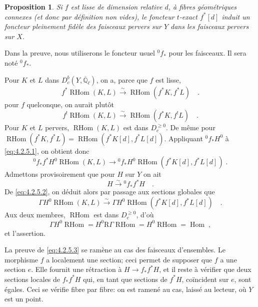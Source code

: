 \documentclass[12pt,a4paper]{article}
\theoremstyle{plain}
\newtheorem{proposition}[theorem]{Proposition}
\theoremstyle{definition}
\DeclareMathOperator{\Hom}{Hom}
\DeclareMathOperator{\RHom}{RHom}
\newcommand{\isom}{\xrightarrow{\sim}}
\providecommand{\Hom}{\operatorname{Hom}}
\providecommand{\R}{\mathrm{R}}
\providecommand{\RHom}{\operatorname{RHom}}
\begin{document}
\begin{proposition}\label{prop:4.2.5}
Si $f$ est lisse de dimension relative $d$, \`{a} fibres g\'{e}om\'{e}triques connexes (et donc par d\'{e}finition non vides), le foncteur $t$-exact $f^{*}[d]$ induit un foncteur pleinement fid\`{e}le des faisceaux pervers sur $Y$ dans les faisceaux pervers sur $X$.
\end{proposition}

Dans la preuve, nous utiliserons le foncteur usuel ${}^{0}f_{*}$ pour les faisceaux. Il sera not\'{e} ${}^{0}f_{*}$.

Pour $K$ et $L$ dans $D_{c}^{b}(Y,\overline{\mathbb{Q}}_{\ell})$, on a, parce que $f$ est lisse,
\begin{equation}\label{eq:4.2.5.1}
f^{*}\RHom(K,L) \isom \RHom(f^{*}K, f^{*}L)\quad.
\end{equation}
pour $f$ quelconque, on aurait plut\^{o}t
\[
f^{!}\RHom(K,L) \isom \RHom(f^{*}K, f^{!}L)\quad.
\]
Pour $K$ et $L$ pervers, $\RHom(K,L)$ est dans $D_{c}^{\geq 0}$. De m\^{e}me pour $\RHom(f^{*}K, f^{*}L) = \RHom(f^{*}K[d], f^{*}L[d])$. Appliquant ${}^{0}f_{*}H^{0}$ \`{a} \eqref{eq:4.2.5.1}, on obtient donc
\begin{equation}\label{eq:4.2.5.2}
{}^{0}f_{*}f^{*}H^{0}\RHom(K,L) \longrightarrow {}^{0}f_{*}H^{0}\RHom(f^{*}K[d], f^{*}L[d])\;.
\end{equation}
Admettons provisoirement que pour $H$ sur $Y$ on ait
\begin{equation}\label{eq:4.2.5.3}
H \isom {}^{0}f_{*}f^{*}H\quad.
\end{equation}
De \eqref{eq:4.2.5.2}, on d\'{e}duit alors par passage aux sections globales que
\[
\Gamma H^{0}\RHom(K,L) \isom \Gamma H^{0}\RHom(f^{*}K[d], f^{*}L[d])\quad.
\]
Aux deux membres, $\RHom$ est dans $D_{c}^{\geq 0}$, d'o\`{u}
\[
\Gamma H^{0}\RHom = H^{0}\R\Gamma\RHom = H^{0}\RHom = \Hom\;,
\]
et l'assertion.

La preuve de \eqref{eq:4.2.5.3} se ram\`{e}ne au cas des faisceaux d'ensembles. Le morphisme $f$ a localement une section; ceci permet de supposer que $f$ a une section $e$. Elle fournit une r\'{e}traction \`{a} $H \longrightarrow f_{*}f^{*}H$, et il reste \`{a} v\'{e}rifier que deux sections locales de $f_{*}f^{*}H$ qui, en tant que sections de $f^{*}H$, co\"{i}ncident sur $e$, sont \'{e}gales. Ceci se v\'{e}rifie fibre par fibre: on est ramen\'{e} au cas, laiss\'{e} au lecteur, o\`{u} $Y$ est un point.
\end{document}
